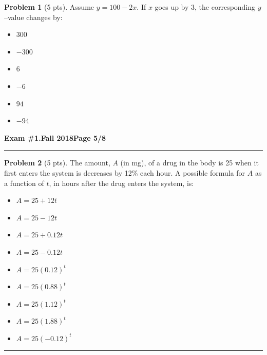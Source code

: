 \documentclass[12pt]{article}
\makeatletter
\theoremstyle{definition}
\newtheorem{problem}{Problem}
\newcommand*{\radiobutton}{%
  \@ifstar{\@radiobutton0}{\@radiobutton1}%
}
\newcommand*{\@radiobutton}[1]{%
  \begin{tikzpicture}
    \pgfmathsetlengthmacro\radius{height("X")/2}
    \draw[radius=\radius] circle;
    \ifcase#1 \fill[radius=.6*\radius] circle;\fi
  \end{tikzpicture}%
}
\makeatother
\begin{document}
\begin{problem}[5 pts]
  Assume $y = 100 - 2x$. If $x$ goes up by 3, the corresponding $y$--value changes by:
  \begin{itemize}
  \item[\radiobutton] $300$
  \item[\radiobutton] $-300$
  \item[\radiobutton] $6$
  \item[\radiobutton] $-6$
  \item[\radiobutton] $94$
  \item[\radiobutton] $-94$
  \end{itemize} 
\end{problem}

\newpage

\hfill{\large\bf Exam \#1.}\hfill{\large\bf  Fall 2018}\hfill{\large\bf Page 5/8}\hrule

\bigskip

\begin{problem}[5 pts]
  The amount, $A$ (in mg), of a drug in the body is 25 when it first enters the system is decreases by 12\% each hour. A
  possible formula for $A$ as a function of $t$, in hours after the drug enters the system, is: 
  \begin{itemize}
  \item[\radiobutton] $A= 25+12t$
  \item[\radiobutton] $A=25-12t$
  \item[\radiobutton] $A=25+0.12t$
  \item[\radiobutton] $A=25-0.12t$
  \item[\radiobutton] $A=25(0.12)^t$
  \item[\radiobutton] $A=25(0.88)^t$
  \item[\radiobutton] $A=25(1.12)^t$
  \item[\radiobutton] $A=25(1.88)^t$
  \item[\radiobutton] $A=25(-0.12)^t$
  \end{itemize}
\end{problem}

\vspace{1cm}
\hrule
\end{document}
